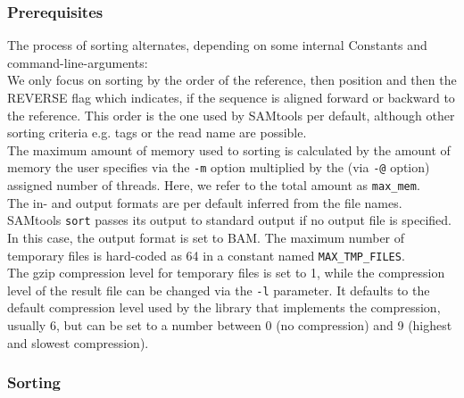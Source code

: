 \subsubsection{Prerequisites}
The process of sorting alternates, depending on some internal Constants and command-line-arguments: \\
We only focus on sorting by the order of the reference, then position and then the REVERSE flag which indicates, if the sequence is aligned forward or backward to the reference. This order is the one used by SAMtools per default, although other sorting criteria e.g. tags or the read name are possible.\\
The maximum amount of memory used to sorting is calculated by the amount of memory the user specifies via the \texttt{-m} option multiplied by the (via \texttt{-@} option) assigned number of threads. Here, we refer to the total amount as \texttt{max\_mem}. \\
The in- and output formats are per default inferred from the file names. \\
SAMtools \texttt{sort} passes its output to standard output if no output file is specified. In this case, the output format is set to BAM.
The maximum number of temporary files is hard-coded as 64 in a constant named \texttt{MAX\_TMP\_FILES}. \\
The gzip compression level for temporary files is set to 1, while the compression level of the result file can be changed via the \texttt{-l} parameter. It defaults to the default compression level used by the library that implements the compression, usually 6, but can be set to a number between 0 (no compression) and 9 (highest and slowest compression).

\subsubsection{Sorting}

